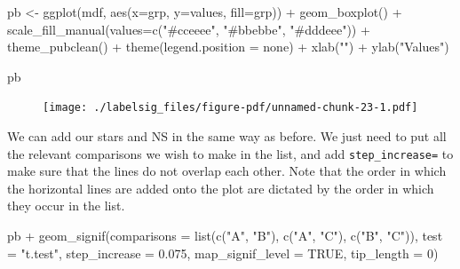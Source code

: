 \documentclass[
  letterpaper,
  DIV=11,
  numbers=noendperiod]{scrreprt}
\newenvironment{Shaded}{\begin{snugshade}}{\end{snugshade}}
\newcommand{\AttributeTok}[1]{\textcolor[rgb]{0.40,0.45,0.13}{#1}}
\newcommand{\ConstantTok}[1]{\textcolor[rgb]{0.56,0.35,0.01}{#1}}
\newcommand{\DecValTok}[1]{\textcolor[rgb]{0.68,0.00,0.00}{#1}}
\newcommand{\FloatTok}[1]{\textcolor[rgb]{0.68,0.00,0.00}{#1}}
\newcommand{\FunctionTok}[1]{\textcolor[rgb]{0.28,0.35,0.67}{#1}}
\newcommand{\NormalTok}[1]{\textcolor[rgb]{0.00,0.23,0.31}{#1}}
\newcommand{\OtherTok}[1]{\textcolor[rgb]{0.00,0.23,0.31}{#1}}
\newcommand{\SpecialCharTok}[1]{\textcolor[rgb]{0.37,0.37,0.37}{#1}}
\newcommand{\StringTok}[1]{\textcolor[rgb]{0.13,0.47,0.30}{#1}}
\begin{document}
\begin{Shaded}
\begin{Highlighting}[]
\NormalTok{pb }\OtherTok{\textless{}{-}} \FunctionTok{ggplot}\NormalTok{(mdf, }\FunctionTok{aes}\NormalTok{(}\AttributeTok{x=}\NormalTok{grp, }\AttributeTok{y=}\NormalTok{values, }\AttributeTok{fill=}\NormalTok{grp)) }\SpecialCharTok{+}
  \FunctionTok{geom\_boxplot}\NormalTok{() }\SpecialCharTok{+}
  \FunctionTok{scale\_fill\_manual}\NormalTok{(}\AttributeTok{values=}\FunctionTok{c}\NormalTok{(}\StringTok{"\#cceeee"}\NormalTok{, }\StringTok{"\#bbebbe"}\NormalTok{, }\StringTok{"\#dddeee"}\NormalTok{)) }\SpecialCharTok{+}
  \FunctionTok{theme\_pubclean}\NormalTok{() }\SpecialCharTok{+}
  \FunctionTok{theme}\NormalTok{(}\AttributeTok{legend.position =} \StringTok{\textquotesingle{}none\textquotesingle{}}\NormalTok{) }\SpecialCharTok{+}
  \FunctionTok{xlab}\NormalTok{(}\StringTok{""}\NormalTok{) }\SpecialCharTok{+}
  \FunctionTok{ylab}\NormalTok{(}\StringTok{"Values"}\NormalTok{)}

\NormalTok{pb}
\end{Highlighting}
\end{Shaded}

\begin{figure}[H]

{\centering \texttt{[image: ./labelsig\_files/figure-pdf/unnamed-chunk-23-1.pdf]}

}

\end{figure}

We can add our stars and NS in the same way as before. We just need to
put all the relevant comparisons we wish to make in the list, and add
\texttt{step\_increase=} to make sure that the lines do not overlap each
other. Note that the order in which the horizontal lines are added onto
the plot are dictated by the order in which they occur in the list.

\begin{Shaded}
\begin{Highlighting}[]
\NormalTok{pb }\SpecialCharTok{+}
  \FunctionTok{geom\_signif}\NormalTok{(}\AttributeTok{comparisons =} \FunctionTok{list}\NormalTok{(}\FunctionTok{c}\NormalTok{(}\StringTok{"A"}\NormalTok{, }\StringTok{"B"}\NormalTok{),}
                                 \FunctionTok{c}\NormalTok{(}\StringTok{"A"}\NormalTok{, }\StringTok{"C"}\NormalTok{),}
                                 \FunctionTok{c}\NormalTok{(}\StringTok{"B"}\NormalTok{, }\StringTok{"C"}\NormalTok{)),}
              \AttributeTok{test =} \StringTok{"t.test"}\NormalTok{, }
              \AttributeTok{step\_increase =} \FloatTok{0.075}\NormalTok{,}
              \AttributeTok{map\_signif\_level =} \ConstantTok{TRUE}\NormalTok{, }
              \AttributeTok{tip\_length =} \DecValTok{0}\NormalTok{)}
\end{Highlighting}
\end{Shaded}
\end{document}
